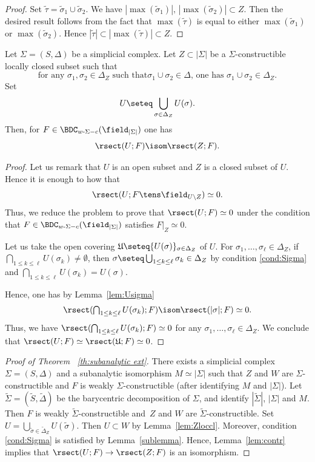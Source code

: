\begin{proof}
Set $\tilde\tau=\tilde\sigma_1\cup\tilde\sigma_2$.
We have
$|\max(\tilde\sigma_1)|,\,|\max(\tilde\sigma_2)|\subset Z$.
Then the desired result follows from the fact that
$\max(\tilde\tau)$ is equal to either
$\max(\tilde\sigma_1)$ or $\max(\tilde\sigma_2)$.
Hence $|\tilde\tau|\subset|\max(\tilde\tau)|\subset Z$.
\end{proof}

\label{subsec:proof}
\begin{lemma}\label{lem:contr}
Let $\Sigma=(S,\Delta)$ be a simplicial complex.
Let $Z\subset|\Sigma|$ be a $\Sigma$\nobreakdash-constructible locally closed subset such that
\begin{equation}
\text{for any $\sigma_1,\sigma_2\in\Delta_Z$ such that
$\sigma_1\cup \sigma_2\in\Delta$, }
\text{one has $\sigma_1\cup\sigma_2\in\Delta_Z$.}
\label{cond:Sigma}
\end{equation}
Set
\[U\seteq\bigcup_{\sigma\in\Delta_Z}U(\sigma).\]
Then, for $F\in\BDC_{w\text-\Sigma-c}(\field_{|\Sigma|})$ one has
\[\rsect(U;F)\isom\rsect(Z;F).\]
\end{lemma}
\begin{proof}
Let us remark that $U$ is an open subset and $Z$ is a closed subset of $U$.
Hence it is enough to how that
\[\rsect(U;F\tens\field_{U\setminus Z})\simeq0.\]
Thus, we reduce the problem to prove that
$\rsect(U;F)\simeq0$ under the condition
that $F\in\BDC_{w\text-\Sigma-c}(\field_{|\Sigma|})$ satisfies $F\vert_Z\simeq0$.

Let us take the open covering
$\mathfrak{U}\seteq\{U(\sigma)\}_{\sigma\in\Delta_Z}$ of $U$.
For $\sigma_1,\ldots,\sigma_\ell\in\Delta_Z$,
if $\bigcap_{1\le k\le \ell}U(\sigma_k)\not=\emptyset$, then
$\sigma\seteq\bigcup_{1\le k\le \ell}\sigma_k\in\Delta_Z$
by condition \eqref{cond:Sigma} and
$\bigcap_{1\le k\le \ell}U(\sigma_k)=U(\sigma)$.

Hence, one has by Lemma~\ref{lem:Usigma}
\[\rsect(\textstyle\bigcap_{1\le k\le \ell}U(\sigma_k);F)
\isom\rsect(|\sigma|;F)\simeq0.\]
Thus, we have
$\rsect(\bigcap_{1\le k\le \ell}U(\sigma_k);F)\simeq0$ for any
$\sigma_1,\ldots,\sigma_\ell\in\Delta_Z$.
We conclude that $\rsect(U;F)\simeq\rsect(\mathfrak{U};F)\simeq0$.
\end{proof}

\begin{proof}[{Proof of {\rm Theorem ~\ref{th:subanalytic ext}}}]
There exists a simplicial complex $\Sigma=(S,\Delta)$
and a subanalytic isomorphism $M\simeq|\Sigma|$
such that
$Z$ and $W$ are $\Sigma$-constructible and
$F$ is weakly $\Sigma$-constructible (after identifying $M$ and $|\Sigma|$).
Let $\tilde\Sigma=(\tilde S,\tilde\Delta)$ be the barycentric decomposition of $\Sigma$,
and identify $|\tilde\Sigma|$, $|\Sigma|$ and $M$.
Then $F$ is weakly $\tilde\Sigma$-constructible and~$Z$ and $W$ are $\tilde\Sigma$-constructible.
Set $U=\bigcup_{\tilde\sigma\in\tilde\Delta_Z}U(\tilde\sigma)$.
Then $U\subset W$ by Lemma~\ref{lem:Zloccl}.
Moreover, condition \eqref{cond:Sigma} is satisfied by Lemma~\ref{sublemma}.
Hence, Lemma~\ref{lem:contr}
implies that
$\rsect(U;F)\to\rsect(Z;F)$ is an isomorphism.
\end{proof}

